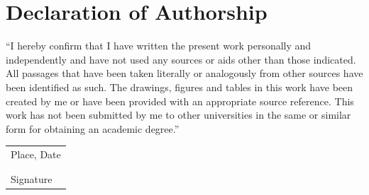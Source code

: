 \section*{Declaration of Authorship}
``I hereby confirm that I have written the present work personally and independently and have not used any sources or aids other than those indicated. All passages that have been taken literally or analogously from other sources have been identified as such. The drawings, figures and tables in this work have been created by me or have been provided with an appropriate source reference. This work has not been submitted by me to other universities in the same or similar form for obtaining an academic degree.''
\vspace{2cm}
\begin{tabular}{l}
Place, Date\\
\\
\\
Signature
\end{tabular}
